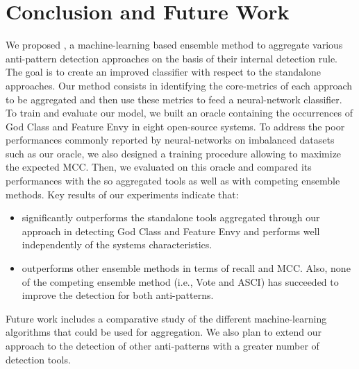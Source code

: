 \section{Conclusion and Future Work}
\label{section: conclusion}

We proposed \NAME{}, a machine-learning based ensemble method to aggregate various anti-pattern detection approaches on the basis of their internal detection rule. The goal is to create an improved classifier with respect to the standalone approaches. Our method consists in identifying the core-metrics of each approach to be aggregated and then use these metrics to feed a neural-network classifier. To train and evaluate our model, we built an oracle containing the occurrences of God Class and Feature Envy in eight open-source systems. To address the poor performances commonly reported by neural-networks on imbalanced datasets such as our oracle, we also designed a training procedure allowing to maximize the expected MCC. Then, we evaluated \NAME{} on this oracle and compared its performances with the so aggregated tools as well as with competing ensemble methods. Key results of our experiments indicate that:

\begin{itemize}
\item \NAME{} significantly outperforms the standalone tools aggregated through our approach in detecting God Class and Feature Envy and performs well independently of the systems characteristics.

\item \NAME{} outperforms other ensemble methods in terms of recall and MCC. Also, none of the competing ensemble method (i.e., Vote and ASCI) has succeeded to improve the detection for both anti-patterns.
\end{itemize}

Future work includes a comparative study of the different machine-learning algorithms that could be used for aggregation. We also plan to extend our approach to the detection of other anti-patterns with a greater number of detection tools.